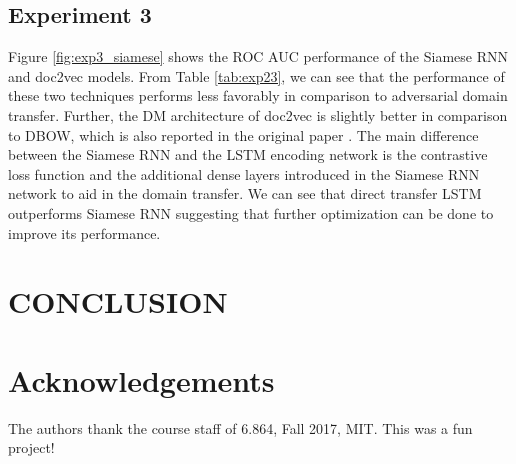 \documentclass{sigkddExp}
\begin{document}
\subsection{Experiment 3}
Figure \ref{fig:exp3_siamese} shows the ROC AUC performance of the Siamese RNN and \textsf{doc2vec} models. From Table \ref{tab:exp23}, we can see that the performance of these two techniques performs less favorably in comparison to adversarial domain transfer. Further, the DM architecture of \textsf{doc2vec} is slightly better in comparison to DBOW, which is also reported in the original paper \cite{doc2vec_paper}. The main difference between the Siamese RNN and the LSTM encoding network is the contrastive loss function and the additional dense layers introduced in the Siamese RNN network to aid in the domain transfer. We can see that direct transfer LSTM outperforms Siamese RNN suggesting that further optimization can be done to improve its performance.

\section{CONCLUSION}


\section{Acknowledgements}
\label{ack}
The authors thank the course staff of 6.864, Fall 2017, MIT. This was a fun project!

%

%
%

\end{document}
